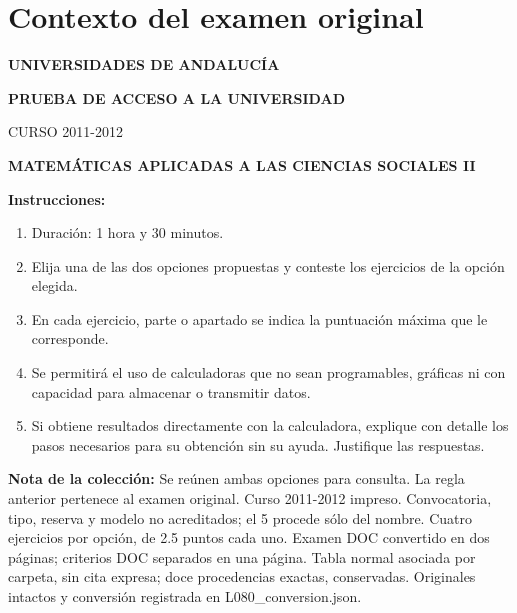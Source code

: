 \section*{Contexto del examen original}
\textbf{UNIVERSIDADES DE ANDALUCÍA}\par
\textbf{PRUEBA DE ACCESO A LA UNIVERSIDAD}\par
CURSO 2011-2012\par
\textbf{MATEMÁTICAS APLICADAS A LAS CIENCIAS SOCIALES II}

\textbf{Instrucciones:}
\begin{enumerate}[label=\textbf{\alph*)}]
  \item Duración: 1 hora y 30 minutos.
  \item Elija una de las dos opciones propuestas y conteste los ejercicios de la opción elegida.
  \item En cada ejercicio, parte o apartado se indica la puntuación máxima que le corresponde.
  \item Se permitirá el uso de calculadoras que no sean programables, gráficas ni con capacidad para almacenar o transmitir datos.
  \item Si obtiene resultados directamente con la calculadora, explique con detalle los pasos necesarios para su obtención sin su ayuda. Justifique las respuestas.
\end{enumerate}
\noindent\textbf{Nota de la colección:} Se reúnen ambas opciones para consulta. La regla anterior pertenece al examen original. Curso 2011-2012 impreso. Convocatoria, tipo, reserva y modelo no acreditados; el 5 procede sólo del nombre. Cuatro ejercicios por opción, de 2.5 puntos cada uno. Examen DOC convertido en dos páginas; criterios DOC separados en una página. Tabla normal asociada por carpeta, sin cita expresa; doce procedencias exactas, conservadas. Originales intactos y conversión registrada en L080\_conversion.json.
\par\medskip
